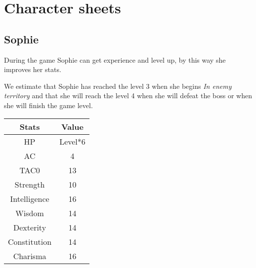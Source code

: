 \section{Character sheets}
\subsection{Sophie}
During the game Sophie can get experience and level up, by this way she improves her stats.

We estimate that Sophie has reached the level 3 when she begins \textit{In enemy territory} and that she will reach the level 4 when she will defeat the boss or when she will finish the game level.
\begin{table}[H]
  \centering
  \begin{tabular}{|c|c|}
    \hline
    \rowcolor[HTML]{C0C0C0}
    \textbf{Stats} & \textbf{Value} \\ \hline
    HP & Level*6 \\ \hline
    AC & 4 \\ \hline
    TAC0 & 13 \\ \hline
    Strength & 10 \\ \hline
    Intelligence & 16 \\ \hline
    Wisdom & 14  \\ \hline
    Dexterity & 14 \\ \hline
    Constitution & 14  \\ \hline
    Charisma & 16 \\ \hline
  \end{tabular}
\end{table}
